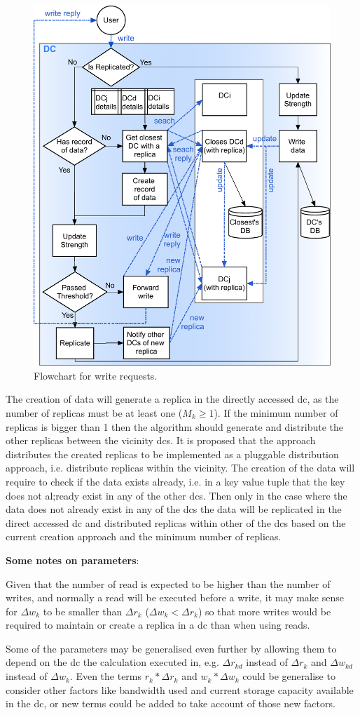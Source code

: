 \documentclass{acm_proc_article-sp}
\begin{document}
\begin{figure}[ht!]
	\includegraphics[width=.47\textwidth]{figures/writeRequestFlowchart.png}
	
	\caption{Flowchart for write requests.}
	\label{fig:write_flowchart}
\end{figure}

The creation of data will generate a replica in the directly accessed \gls{dc}, as the number of replicas must be at least one ($M_{k} \ge 1$). If the minimum number of replicas is bigger than 1 then the algorithm should generate and distribute the other replicas between the vicinity \glspl{dc}. It is proposed that the approach distributes the created replicas to be implemented as a pluggable distribution approach, i.e. distribute replicas within the vicinity. The creation of the data will require to check if the data exists already, i.e. in a key value tuple that the key does not al;ready exist in any of the other \glspl{dc}. Then only in the case where the data does not already exist in any of the \glspl{dc} the data will be replicated in the direct accessed \gls{dc} and distributed replicas within other of the \glspl{dc} based on the current creation approach and the minimum number of replicas.


{\bf Some notes on parameters}: 

Given that the number of read is expected to be higher than the number of writes, and normally a read will be executed before a write, it may make sense for $\Delta w_{k}$ to be smaller than $\Delta r_{k}$ ($\Delta w_{k} < \Delta r_{k}$) so that more writes would be required to maintain or create a replica in a \gls{dc} than when using reads.

Some of the parameters may be generalised even further by allowing them to depend on the \gls{dc} the calculation executed in, e.g. $\Delta r_{kd}$ instead of $\Delta r_{k}$ and $\Delta w_{kd}$ instead of $\Delta w_{k}$. Even the terms $r_{k} * \Delta r_{k}$ and $w_{k} * \Delta w_{k}$ could be generalise to consider other factors like bandwidth used and current storage capacity available in the \gls{dc}, or new terms could be added to take account of those new factors.
\end{document}
